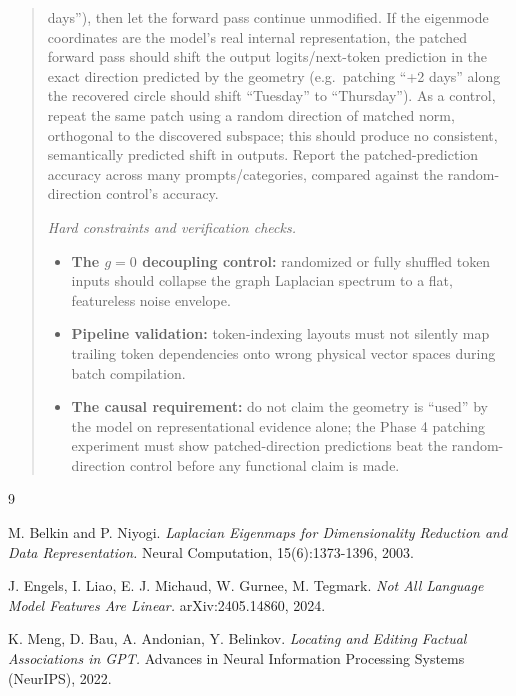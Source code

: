 \documentclass[11pt]{article}
\begin{document}
\begin{quote}
\begin{itemize}
        days''), then let the forward pass continue unmodified. If the
        eigenmode coordinates are the model's real internal representation,
        the patched forward pass should shift the output logits/next-token
        prediction in the exact direction predicted by the geometry (e.g.\
        patching ``+2 days'' along the recovered circle should shift
        ``Tuesday'' to ``Thursday''). As a control, repeat the same patch
        using a random direction of matched norm, orthogonal to the
        discovered subspace; this should produce no consistent,
        semantically predicted shift in outputs. Report the
        patched-prediction accuracy across many prompts/categories,
        compared against the random-direction control's accuracy.
\end{itemize}

\textit{Hard constraints and verification checks.}
\begin{itemize}
  \item \textbf{The $g=0$ decoupling control:} randomized or fully shuffled
        token inputs should collapse the graph Laplacian spectrum to a
        flat, featureless noise envelope.
  \item \textbf{Pipeline validation:} token-indexing layouts must not
        silently map trailing token dependencies onto wrong physical
        vector spaces during batch compilation.
  \item \textbf{The causal requirement:} do not claim the geometry is
        ``used'' by the model on representational evidence alone; the
        Phase 4 patching experiment must show patched-direction predictions
        beat the random-direction control before any functional claim is
        made.
\end{itemize}
\end{quote}

\begin{thebibliography}{9}

M. Belkin and P. Niyogi.
\textit{Laplacian Eigenmaps for Dimensionality Reduction and Data
Representation.}
Neural Computation, 15(6):1373-1396, 2003.

J. Engels, I. Liao, E. J. Michaud, W. Gurnee, M. Tegmark.
\textit{Not All Language Model Features Are Linear.}
arXiv:2405.14860, 2024.

K. Meng, D. Bau, A. Andonian, Y. Belinkov.
\textit{Locating and Editing Factual Associations in GPT.}
Advances in Neural Information Processing Systems (NeurIPS), 2022.

\end{thebibliography}
\end{document}
